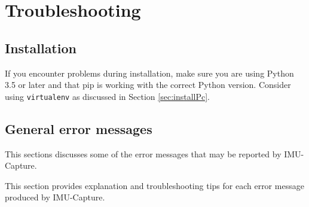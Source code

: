 \documentclass[11pt,letterpaper,article,oneside]{memoir}
\newcommand{\name}{IMU-Capture}
\begin{document}
\chapter{Troubleshooting}

\section{Installation}

If you encounter problems during installation, make sure you are using Python
3.5 or later and that pip is working with the correct Python version. Consider
using \texttt{virtualenv} as discussed in Section \ref{sec:installPc}.


\section{General error messages}

This sections discusses some of the error messages that may be reported by
\name{}.


\newcommand{\genericFix}{Try resetting the Arduino.  Make sure that the Arduino
is correctly powered and connected to the PC (Section \ref{sec:wiring}), and
that the correct code is installed on the Arduino (Section
\ref{sec:installarduinocode}).}

This section provides explanation and troubleshooting tips for each error
message produced by \name{}.
\end{document}
